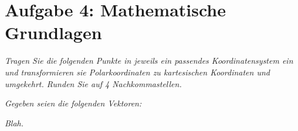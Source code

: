 \documentclass[
  ngerman,
  DIV=14
]{scrartcl}
\begin{document}






\section*{Aufgabe 4: Mathematische Grundlagen}

\emph{Tragen Sie die folgenden Punkte in jeweils ein passendes Koordinatensystem ein und transformieren sie Polarkoordinaten zu kartesischen Koordinaten und umgekehrt. Runden Sie auf 4 Nachkommastellen.}

\emph{Gegeben seien die folgenden Vektoren:}

\emph{Blah.}
\end{document}
